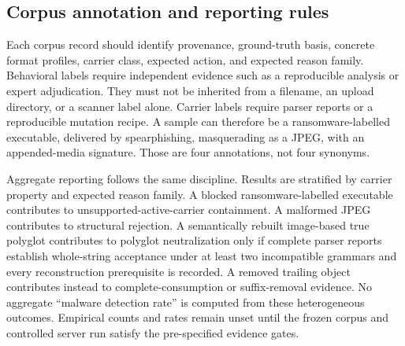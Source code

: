 \subsection{Corpus annotation and reporting rules}

Each corpus record should identify provenance, ground-truth basis, concrete
format profiles, carrier class, expected action, and expected reason family.
Behavioral labels require independent evidence such as a reproducible analysis
or expert adjudication. They must not be inherited from a filename, an upload
directory, or a scanner label alone. Carrier labels require parser reports or a
reproducible mutation recipe. A sample can therefore be a ransomware-labelled
executable, delivered by spearphishing, masquerading as a JPEG, with an
appended-media signature. Those are four annotations, not four synonyms.

Aggregate reporting follows the same discipline. Results are stratified by
carrier property and expected reason family. A blocked ransomware-labelled
executable contributes to unsupported-active-carrier containment. A malformed
JPEG contributes to structural rejection. A semantically rebuilt image-based
true polyglot contributes to polyglot neutralization only if complete parser
reports establish whole-string acceptance under at least two incompatible
grammars and every reconstruction prerequisite is recorded. A removed trailing
object contributes instead to complete-consumption or suffix-removal evidence.
No aggregate ``malware detection rate'' is computed from these heterogeneous
outcomes. Empirical counts and rates remain unset until the frozen corpus and
controlled server run satisfy the pre-specified evidence gates.
